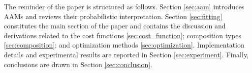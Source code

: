 The reminder of the paper is structured as follows. Section \ref{sec:aam} introduces AAMs and reviews their probabilistic interpretation. Section \ref{sec:fitting} constitutes the main section of the paper and contains the discussion and derivations related to the cost functions \ref{sec:cost_function}; composition types \ref{sec:composition}; and optimization methods \ref{sec:optimization}. Implementation details and experimental results are reported in Section \ref{sec:experiment}. Finally, conclusions are drawn in Section \ref{sec:conclusion}.

